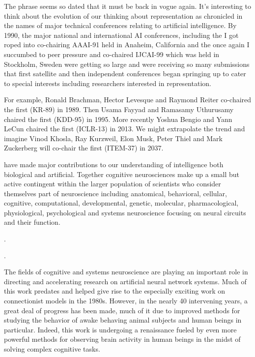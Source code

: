 {{{  The phrase {} seems so dated that it must be back in vogue again. It's interesting to think about the evolution of our thinking about representation as chronicled in the names of major technical conferences relating to artificial intelligence. By 1990, the major national and international AI conferences, including the {} \emdash{} I got roped into co-chairing AAAI-91 held in Anaheim, California \emdash{} and the {} \emdash{} once again I succumbed to peer pressure and co-chaired IJCAI-99 which was held in Stockholm, Sweden \emdash{} were getting so large and were receiving so many submissions that first satellite and then independent conferences began springing up to cater to special interests including researchers interested in representation.

  For example, Ronald Brachman, Hector Levesque and Raymond Reiter co-chaired the first {} (KR-89) in 1989. Then Usama Fayyad and Ramasamy Uthurusamy chaired the first {} (KDD-95) in 1995. More recently Yoshua Bengio and Yann LeCun chaired the first {} (ICLR-13) in 2013. We might extrapolate the trend and imagine Vinod Khosla, Ray Kurzweil, Elon Musk, Peter Thiel and Mark Zuckerberg will co-chair the first {} (ITEM-37) in 2037.}
%
\emdash{} have made major contributions to our understanding of intelligence both biological and artificial. Together cognitive neurosciences make up a small but active contingent within the larger population of scientists who consider themselves part of neuroscience including anatomical, behavioral, cellular, cognitive, computational, developmental, genetic, molecular, pharmacological, physiological, psychological and systems neuroscience focusing on neural circuits and their function.}.}.

The fields of cognitive and systems neuroscience are playing an important role in directing and accelerating research on artificial neural network systems. Much of this work predates and helped give rise to the especially exciting work on connectionist models in the 1980s. However, in the nearly 40 intervening years, a great deal of progress has been made, much of it due to improved methods for studying the behavior of awake behaving animal subjects and human beings in particular. Indeed, this work is undergoing a renaissance fueled by even more powerful methods for observing brain activity in human beings in the midst of solving complex cognitive tasks.

